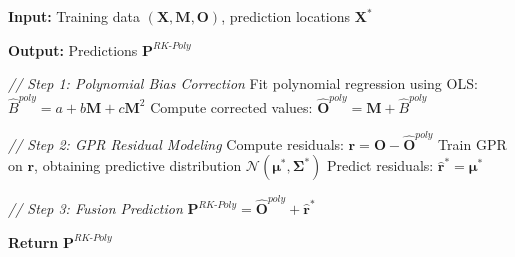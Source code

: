 \documentclass[a4paper]{article}
\begin{document}
\begin{algorithm}[h]
\caption{RK-Poly Training and Prediction Flow}
\label{alg:rkpoly}
\begin{algorithmic}[1]
\State \textbf{Input:} Training data $(\mathbf{X}, \mathbf{M}, \mathbf{O})$, prediction locations $\mathbf{X}^*$

\State \textbf{Output:} Predictions $\mathbf{P}^{RK\text{-}Poly}$

\State \textit{// Step 1: Polynomial Bias Correction}
\State Fit polynomial regression using OLS: $\hat{B}^{poly} = a + b\mathbf{M} + c\mathbf{M}^2$
\State Compute corrected values: $\hat{\mathbf{O}}^{poly} = \mathbf{M} + \hat{B}^{poly}$

\State \textit{// Step 2: GPR Residual Modeling}
\State Compute residuals: $\mathbf{r} = \mathbf{O} - \hat{\mathbf{O}}^{poly}$
\State Train GPR on $\mathbf{r}$, obtaining predictive distribution $\mathcal{N}(\boldsymbol{\mu}^*, \boldsymbol{\Sigma}^*)$
\State Predict residuals: $\hat{\mathbf{r}}^* = \boldsymbol{\mu}^*$

\State \textit{// Step 3: Fusion Prediction}
\State $\mathbf{P}^{RK\text{-}Poly} = \hat{\mathbf{O}}^{poly} + \hat{\mathbf{r}}^*$

\State \textbf{Return} $\mathbf{P}^{RK\text{-}Poly}$
\end{algorithmic}
\end{algorithm}
\end{document}

